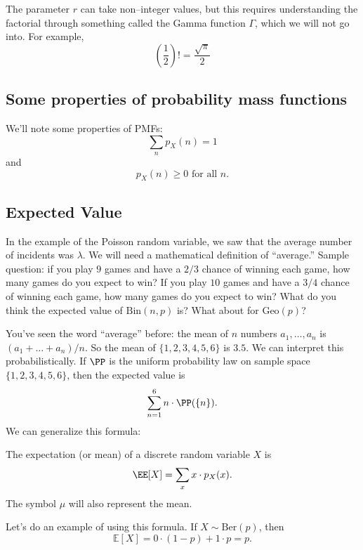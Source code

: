 \documentclass{ximera}
\begin{document}
The parameter $r$ can take non--integer values, but this requires understanding the factorial through something called the Gamma function $\Gamma$, which we will not go into. For example,
$$
\left( \frac{1}{2}\right)! = \frac{\sqrt{\pi}}{2}
$$

\subsection{Some properties of probability mass functions}
We'll note some properties of PMFs:
$$
\sum_n p_X(n) = 1
$$
and 
$$
p_X(n) \geq 0 \text{ for all } n.
$$

\newpage



\subsection{Expected Value}
In the example of the Poisson random variable, we saw that the average number of incidents was $\lambda$. We will need a mathematical definition of ``average.'' Sample question: if you play $9$ games and have a $2/3$ chance of winning each game, how many games do you expect to win? If you play $10$ games and have a $3/4$ chance of winning each game, how many games do you expect to win? What do you think the expected value of $\text{Bin}(n,p)$ is? What about for $\text{Geo}(p)$?

You've seen the word ``average'' before: the mean of $n$ numbers 
$
a_1,\ldots,a_n$ is $ (a_1 + \ldots + a_n)/n.
$
So the mean of $\{1,2,3,4,5,6\}$ is $3.5$. We can interpret this probabilistically. If $\PP$ is the uniform probability law on sample space $\{1,2,3,4,5,6\}$, then the expected value is
$$
\sum_{n=1}^6 n \cdot \PP(\{n\}).
$$
We can generalize this formula:
\begin{definition}
The expectation (or mean) of a discrete random variable $X$ is 
$$
\EE[X] = \sum_x x\cdot p_X(x).
$$
The symbol $\mu$ will also represent the mean. 
\end{definition}

Let's do an example of using this formula. If $X \sim \text{Ber}(p)$, then
$$
\mathbb{E}[X] = 0 \cdot (1-p) + 1 \cdot p = p.
$$
\end{document}
